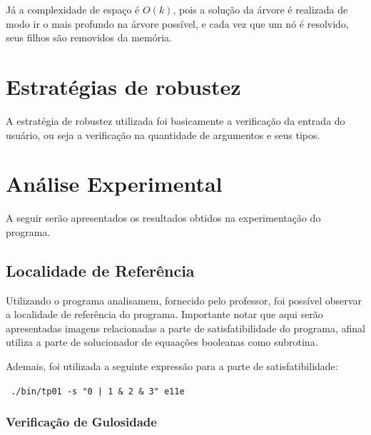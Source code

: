 \documentclass{article}
\begin{document}
Já a complexidade de espaço é $O(k)$, pois a solução da árvore é realizada de modo ir o mais profundo na árvore possível, e cada vez que um nó é resolvido, seus filhos são removidos da memória.
\section{Estratégias de robustez}

A estratégia de robustez utilizada foi basicamente a verificação da entrada do usuário, ou seja a verificação na quantidade de argumentos e seus tipos.

\section{Análise Experimental}

A seguir serão apresentados os resultados obtidos na experimentação do programa.

\subsection{Localidade de Referência}

Utilizando o programa analisamem, fornecido pelo professor, foi possível observar a localidade de referência do programa. Importante notar que aqui serão apresentadas imagens relacionadas a parte de satisfatibilidade do programa, afinal utiliza a parte de solucionador de equaações booleanas como subrotina.


Ademais, foi utilizada a seguinte expressão para a parte de satisfatibilidade:

\verb# ./bin/tp01 -s "0 | 1 & 2 & 3" e11e#

        
\subsubsection{Verificação de Gulosidade}
\end{document}
